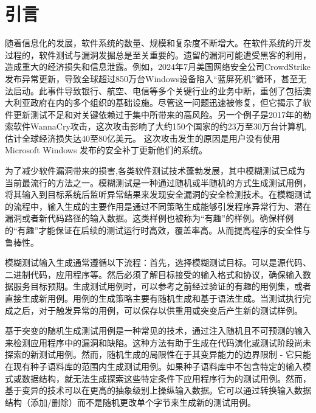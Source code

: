 \documentclass[10.5pt,compsoc]{CjC}
\theoremstyle{mystyle}
\begin{document}
\clearpage\clearpage
\begin{strip}
\vspace {-13mm}
\end{strip}
    \linespread{1.15}
\heiti 
{}
\vskip 1mm

\section{引言}
\songti
随着信息化的发展，软件系统的数量、规模和复杂度不断增大。在软件系统的开发过程的，软件测试与漏洞发掘总是至关重要的。遗留的漏洞可能遭受黑客的利用，造成重大的经济损失和信息泄露。例如，2024年7月美国网络安全公司CrowdStrike发布异常更新，导致全球超过850万台Windows设备陷入“蓝屏死机”循环，甚至无法启动。此事件导致银行、航空、电信等多个关键行业的业务中断，重创了包括澳大利亚政府在内的多个组织的基础设施。尽管这一问题迅速被修复，但它揭示了软件更新测试不足和对关键依赖过于集中所带来的高风险\cite{Jones}。另一个例子是2017年的勒索软件WannaCry攻击，这次攻击影响了大约150个国家的约23万至30万台计算机,估计全球经济损失达40至80亿美元。 这次攻击发生的原因是用户没有使用 Microsoft Windows 发布的安全补丁更新他们的系统\cite{Maria}。

为了减少软件漏洞带来的损害,各类软件测试技术蓬勃发展，其中模糊测试已成为当前最流行的方法之一。模糊测试是一种通过随机或半随机的方式生成测试用例，将其输入到目标系统后监听异常结果来发现安全漏洞的安全检测技术。在模糊测试的流程中，输入生成的主要作用是通过不同策略生成能够引发程序异常行为、潜在漏洞或者新代码路径的输入数据。这类样例也被称为“有趣”的样例。确保样例的“有趣”才能保证在后续的测试运行时高效，覆盖率高。从而提高程序的安全性与鲁棒性。

模糊测试输入生成通常遵循以下流程：首先，选择模糊测试目标。可以是源代码、二进制代码，应用程序等。然后必须了解目标接受的输入格式和协议，确保输入数据服务目标预期。生成测试用例时，可以参考之前经过验证的有趣的用例集，或者直接生成新用例。用例的生成策略主要有随机生成和基于语法生成。当测试执行完成之后，对于触发异常的用例，可以保存以供重用或突变后产生新的测试样例。 

基于突变的随机生成测试用例\cite{LibFuzzer, Chenyang, Shuitao}是一种常见的技术，通过注入随机且不可预测的输入来检测应用程序中的漏洞和缺陷。这种方法有助于生成在代码演化或测试阶段尚未探索的新测试用例。然而，随机生成的局限性在于其变异能力的边界限制 - 它只能在现有种子语料库的范围内生成测试用例。如果种子语料库中不包含特定的输入模式或数据结构，就无法生成探索这些特定条件下应用程序行为的测试用例。然而，基于变异的技术可以在更高的抽象级别上操纵输入数据。它可以通过转换输入数据结构（添加/删除）而不是随机更改单个字节来生成新的测试用例。
\end{document}
